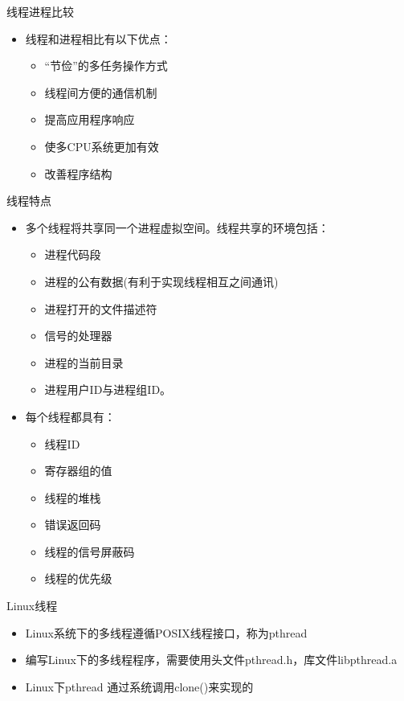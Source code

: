 \begin{frame}{线程进程比较}
     \begin{itemize}
     \item 线程和进程相比有以下优点：
          \begin{itemize}
          \item “节俭”的多任务操作方式
          \item 线程间方便的通信机制
          \item 提高应用程序响应
          \item 使多CPU系统更加有效
          \item 改善程序结构
          \end{itemize}
     \end{itemize}
\end{frame}

\begin{frame}{线程特点}
\begin{itemize}
\item 多个线程将共享同一个进程虚拟空间。线程共享的环境包括：
          \begin{itemize}
          \item 进程代码段
          \item 进程的公有数据(有利于实现线程相互之间通讯)
          \item 进程打开的文件描述符
          \item 信号的处理器
          \item 进程的当前目录
          \item 进程用户ID与进程组ID。
          \end{itemize}
\item 每个线程都具有：
          \begin{itemize}
          \item 线程ID
          \item 寄存器组的值
          \item 线程的堆栈
          \item 错误返回码
          \item 线程的信号屏蔽码
          \item 线程的优先级
          \end{itemize}
\end{itemize}
\end{frame}


\begin{frame}{Linux线程}
\begin{itemize}
\item Linux系统下的多线程遵循POSIX线程接口，称为pthread
\item 编写Linux下的多线程程序，需要使用头文件pthread.h，库文件libpthread.a
\item Linux下pthread 通过系统调用clone()来实现的
\end{itemize}
\end{frame}


